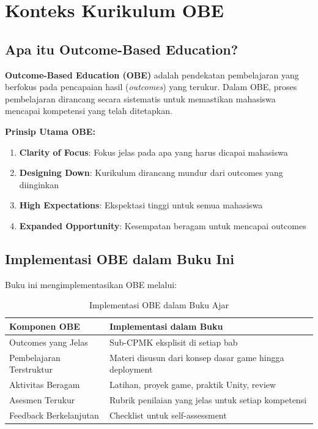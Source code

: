 \section{Konteks Kurikulum OBE}

\subsection{Apa itu Outcome-Based Education?}

\textbf{Outcome-Based Education (OBE)} adalah pendekatan pembelajaran yang berfokus pada pencapaian hasil (\textit{outcomes}) yang terukur. Dalam OBE, proses pembelajaran dirancang secara sistematis untuk memastikan mahasiswa mencapai kompetensi yang telah ditetapkan.

\textbf{Prinsip Utama OBE:}
\begin{enumerate}
  \item \textbf{Clarity of Focus}: Fokus jelas pada apa yang harus dicapai mahasiswa
  \item \textbf{Designing Down}: Kurikulum dirancang mundur dari outcomes yang diinginkan
  \item \textbf{High Expectations}: Ekspektasi tinggi untuk semua mahasiswa
  \item \textbf{Expanded Opportunity}: Kesempatan beragam untuk mencapai outcomes
\end{enumerate}

\subsection{Implementasi OBE dalam Buku Ini}

Buku ini mengimplementasikan OBE melalui:

\begin{table}[h]
\centering
\begin{tabular}{|l|p{10cm}|}
\hline
\textbf{Komponen OBE} & \textbf{Implementasi dalam Buku} \\
\hline
Outcomes yang Jelas & Sub-CPMK eksplisit di setiap bab \\
\hline
Pembelajaran Terstruktur & Materi disusun dari konsep dasar game hingga deployment \\
\hline
Aktivitas Beragam & Latihan, proyek game, praktik Unity, review \\
\hline
Asesmen Terukur & Rubrik penilaian yang jelas untuk setiap kompetensi \\
\hline
Feedback Berkelanjutan & Checklist untuk self-assessment \\
\hline
\end{tabular}
\caption{Implementasi OBE dalam Buku Ajar}
\end{table}

